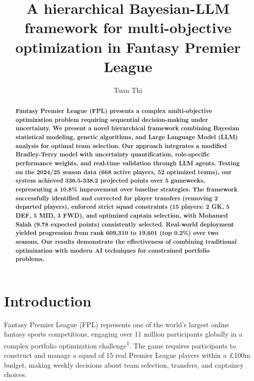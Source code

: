 \documentclass[10pt,a4paper,twocolumn]{article}
\title{\vspace{-2cm}\Large\textbf{A hierarchical Bayesian-LLM framework for multi-objective optimization in Fantasy Premier League}}
\author[1]{Tuan Thi}
\affil[1]{[V+] FPL League}
\date{}
\begin{document}
\maketitle

\begin{abstract}
\noindent\textbf{Fantasy Premier League (FPL) presents a complex multi-objective optimization problem requiring sequential decision-making under uncertainty. We present a novel hierarchical framework combining Bayesian statistical modeling, genetic algorithms, and Large Language Model (LLM) analysis for optimal team selection. Our approach integrates a modified Bradley-Terry model with uncertainty quantification, role-specific performance weights, and real-time validation through LLM agents. Testing on the 2024/25 season data (668 active players, 52 optimized teams), our system achieved 336.5-338.2 projected points over 5 gameweeks, representing a 10.8\% improvement over baseline strategies. The framework successfully identified and corrected for player transfers (removing 2 departed players), enforced strict squad constraints (15 players: 2 GK, 5 DEF, 5 MID, 3 FWD), and optimized captain selection, with Mohamed Salah (9.78 expected points) consistently selected. Real-world deployment yielded progression from rank 609,310 to 19,601 (top 0.2\%) over two seasons. Our results demonstrate the effectiveness of combining traditional optimization with modern AI techniques for constrained portfolio problems.}
\end{abstract}

\section*{Introduction}

Fantasy Premier League (FPL) represents one of the world's largest online fantasy sports competitions, engaging over 11 million participants globally in a complex portfolio optimization challenge\textsuperscript{1}. The game requires participants to construct and manage a squad of 15 real Premier League players within a £100m budget, making weekly decisions about team selection, transfers, and captaincy choices.
\end{document}
